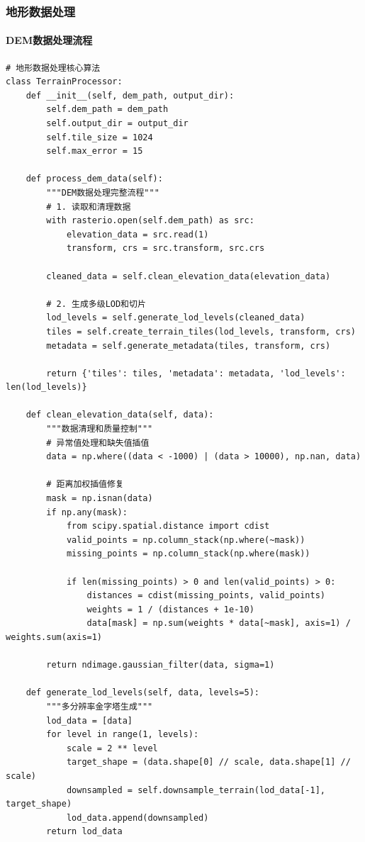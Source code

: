 \hypertarget{ux5730ux5f62ux6570ux636eux5904ux7406}{%
\subsubsection{地形数据处理}\label{ux5730ux5f62ux6570ux636eux5904ux7406}}

\hypertarget{demux6570ux636eux5904ux7406ux6d41ux7a0b}{%
\paragraph{DEM数据处理流程}\label{demux6570ux636eux5904ux7406ux6d41ux7a0b}}

\begin{lstlisting}[style=python]
# 地形数据处理核心算法
class TerrainProcessor:
    def __init__(self, dem_path, output_dir):
        self.dem_path = dem_path
        self.output_dir = output_dir
        self.tile_size = 1024
        self.max_error = 15
        
    def process_dem_data(self):
        """DEM数据处理完整流程"""
        # 1. 读取和清理数据
        with rasterio.open(self.dem_path) as src:
            elevation_data = src.read(1)
            transform, crs = src.transform, src.crs
            
        cleaned_data = self.clean_elevation_data(elevation_data)
        
        # 2. 生成多级LOD和切片
        lod_levels = self.generate_lod_levels(cleaned_data)
        tiles = self.create_terrain_tiles(lod_levels, transform, crs)
        metadata = self.generate_metadata(tiles, transform, crs)
        
        return {'tiles': tiles, 'metadata': metadata, 'lod_levels': len(lod_levels)}
    
    def clean_elevation_data(self, data):
        """数据清理和质量控制"""
        # 异常值处理和缺失值插值
        data = np.where((data < -1000) | (data > 10000), np.nan, data)
        
        # 距离加权插值修复
        mask = np.isnan(data)
        if np.any(mask):
            from scipy.spatial.distance import cdist
            valid_points = np.column_stack(np.where(~mask))
            missing_points = np.column_stack(np.where(mask))
            
            if len(missing_points) > 0 and len(valid_points) > 0:
                distances = cdist(missing_points, valid_points)
                weights = 1 / (distances + 1e-10)
                data[mask] = np.sum(weights * data[~mask], axis=1) / weights.sum(axis=1)
                
        return ndimage.gaussian_filter(data, sigma=1)
    
    def generate_lod_levels(self, data, levels=5):
        """多分辨率金字塔生成"""
        lod_data = [data]
        for level in range(1, levels):
            scale = 2 ** level
            target_shape = (data.shape[0] // scale, data.shape[1] // scale)
            downsampled = self.downsample_terrain(lod_data[-1], target_shape)
            lod_data.append(downsampled)
        return lod_data
\end{lstlisting}


